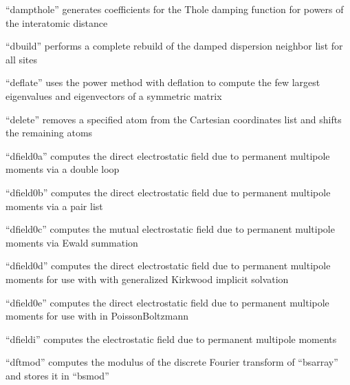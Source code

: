 \documentclass[letterpaper,11pt,english]{sphinxmanual}
\begin{document}
“dampthole” generates coefficients for the Thole damping
function for powers of the interatomic distance


“dbuild” performs a complete rebuild of the damped dispersion
neighbor list for all sites


“deflate” uses the power method with deflation to compute the
few largest eigenvalues and eigenvectors of a symmetric matrix


“delete” removes a specified atom from the Cartesian
coordinates list and shifts the remaining atoms





“dfield0a” computes the direct electrostatic field due to
permanent multipole moments via a double loop


“dfield0b” computes the direct electrostatic field due to
permanent multipole moments via a pair list


“dfield0c” computes the mutual electrostatic field due to
permanent multipole moments via Ewald summation


“dfield0d” computes the direct electrostatic field due to
permanent multipole moments for use with with generalized
Kirkwood implicit solvation


“dfield0e” computes the direct electrostatic field due to
permanent multipole moments for use with in Poisson\sphinxhyphen{}Boltzmann


“dfieldi” computes the electrostatic field due to permanent
multipole moments


“dftmod” computes the modulus of the discrete Fourier transform
of “bsarray” and stores it in “bsmod”
\end{document}
